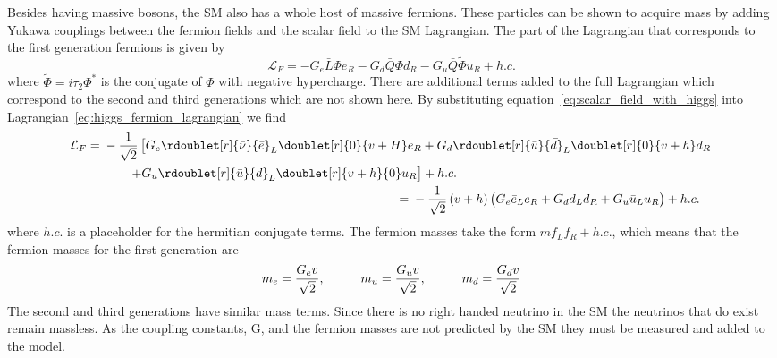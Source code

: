 Besides having massive bosons, the SM also has a whole host of massive fermions.
These particles can be shown to acquire mass by adding Yukawa couplings between the fermion fields and the scalar field to the SM Lagrangian.
The part of the Lagrangian that corresponds to the first generation fermions is given by
\begin{equation}\label{eq:higgs_fermion_lagrangian}
	\mathcal{L}_{F}=-G_{e}\bar{L}{\Phi}e_{R}-G_{d}\bar{Q}{\Phi}d_{R}-G_{u}\bar{Q}\tilde{\Phi}u_{R}+h.c.
\end{equation}
where $\tilde{\Phi}=i\tau_{2}\Phi^{*}$ is the conjugate of $\Phi$ with negative hypercharge.
There are additional terms added to the full Lagrangian which correspond to the second and third generations which are not shown here.
By substituting equation~\ref{eq:scalar_field_with_higgs} into Lagrangian~\ref{eq:higgs_fermion_lagrangian} we find
\begin{align}
	\begin{split}
		\mathcal{L}_{F}={}&-\frac{1}{\sqrt{2}}\left[G_{e}\rdoublet[r]{\bar{\nu}}{\bar{e}}_{L}\doublet[r]{0}{v+H}e_{R}+G_{d}\rdoublet[r]{\bar{u}}{\bar{d}}_{L}\doublet[r]{0}{v+h}d_{R}\right.\\
		&\qquad \left. +G_{u}\rdoublet[r]{\bar{u}}{\bar{d}}_{L}\doublet[r]{v+h}{0}u_{R}\right]+h.c.
	\end{split}\\
	\begin{split}
		={}&-\frac{1}{\sqrt{2}}\left(v+h\right)\left(G_{e}\bar{e}_{L}e_{R}+G_{d}\bar{d}_{L}d_{R}+G_{u}\bar{u}_{L}u_{R}\right)+h.c.
	\end{split}
\end{align}
where $h.c.$ is a placeholder for the hermitian conjugate terms.
The fermion masses take the form $m\bar{f}_{L}f_{R}+h.c.$, which means that the fermion masses for the first generation are
\begin{equation}
	m_{e}=\frac{G_{e}v}{\sqrt{2}},\hspace*{1cm}m_{u}=\frac{G_{u}v}{\sqrt{2}},\hspace*{1cm}m_{d}=\frac{G_{d}v}{\sqrt{2}}
\end{equation}
The second and third generations have similar mass terms.
Since there is no right handed neutrino in the SM the neutrinos that do exist remain massless.
As the coupling constants, G, and the fermion masses are not predicted by the SM they must be measured and added to the model.














